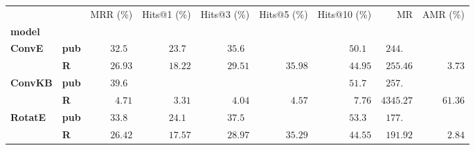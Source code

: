 \begin{tabular}{llrrrrrrr}
\toprule
       &   &           MRR (\%) &        Hits@1 (\%) &        Hits@3 (\%) &        Hits@5 (\%) &       Hits@10 (\%) &                             MR &           AMR (\%) \\
\textbf{model} & {} &                    &                    &                    &                    &                    &                                &                    \\
\midrule
\textbf{ConvE} & \textbf{pub} &  $32.5\phantom{0}$ &  $23.7\phantom{0}$ &  $35.6\phantom{0}$ &                    &  $50.1\phantom{0}$ &  $\phantom{0}244.\phantom{00}$ &                    \\
       & \textbf{R} &            $26.93$ &            $18.22$ &            $29.51$ &            $35.98$ &            $44.95$ &            $\phantom{0}255.46$ &  $\phantom{0}3.73$ \\\midrule
\textbf{ConvKB} & \textbf{pub} &  $39.6\phantom{0}$ &                    &                    &                    &  $51.7\phantom{0}$ &  $\phantom{0}257.\phantom{00}$ &                    \\
       & \textbf{R} &  $\phantom{0}4.71$ &  $\phantom{0}3.31$ &  $\phantom{0}4.04$ &  $\phantom{0}4.57$ &  $\phantom{0}7.76$ &                      $4345.27$ &            $61.36$ \\\midrule
\textbf{RotatE} & \textbf{pub} &  $33.8\phantom{0}$ &  $24.1\phantom{0}$ &  $37.5\phantom{0}$ &                    &  $53.3\phantom{0}$ &  $\phantom{0}177.\phantom{00}$ &                    \\
       & \textbf{R} &            $26.42$ &            $17.57$ &            $28.97$ &            $35.29$ &            $44.55$ &            $\phantom{0}191.92$ &  $\phantom{0}2.84$ \\
\bottomrule
\end{tabular}

